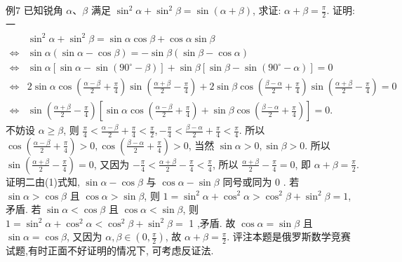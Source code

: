 例7 已知锐角 $\alpha 、 \beta$ 满足 $\sin ^2 \alpha+\sin ^2 \beta=\sin (\alpha+ \beta)$, 求证: $\alpha+\beta=\frac{\pi}{2}$.
证明:一 
$$
\begin{aligned}
& \sin ^2 \alpha+\sin ^2 \beta=\sin \alpha \cos \beta+\cos \alpha \sin \beta \\
\Leftrightarrow & \sin \alpha(\sin \alpha-\cos \beta)=-\sin \beta(\sin \beta-\cos \alpha) \\
\Leftrightarrow & \sin \alpha\left[\sin \alpha-\sin \left(90^{\circ}-\beta\right)\right]+\sin \beta\left[\sin \beta-\sin \left(90^{\circ}-\alpha\right)\right]=0 \\
\Leftrightarrow & 2 \sin \alpha \cos \left(\frac{\alpha-\beta}{2}+\frac{\pi}{4}\right) \sin \left(\frac{\alpha+\beta}{2}-\frac{\pi}{4}\right)+2 \sin \beta \cos \left(\frac{\beta-\alpha}{2}+\frac{\pi}{4}\right)  \sin \left(\frac{\alpha+\beta}{2}-\frac{\pi}{4}\right)=0 \\
\Leftrightarrow & \sin \left(\frac{\alpha+\beta}{2}-\frac{\pi}{4}\right)\left[\sin \alpha \cos \left(\frac{\alpha-\beta}{2}+\frac{\pi}{4}\right)+\sin \beta \cos \left(\frac{\beta-\alpha}{2}+\frac{\pi}{4}\right)\right]=0 .
\end{aligned}
$$
不妨设 $\alpha \geqslant \beta$, 则 $\frac{\pi}{4}<\frac{\alpha-\beta}{2}+\frac{\pi}{4}<\frac{\pi}{2},-\frac{\pi}{4}<\frac{\beta-\alpha}{2}+\frac{\pi}{4}<\frac{\pi}{4}$.
所以 $\cos \left(\frac{\alpha-\beta}{2}+\frac{\pi}{4}\right)>0, \cos \left(\frac{\beta-\alpha}{2}+\frac{\pi}{4}\right)>0$, 当然 $\sin \alpha>0, \sin \beta>0$.
所以 $\sin \left(\frac{\alpha+\beta}{2}-\frac{\pi}{4}\right)=0$, 又因为 $-\frac{\pi}{4}<\frac{\alpha+\beta}{2}-\frac{\pi}{4}<\frac{\pi}{4}$, 所以 $\frac{\alpha+\beta}{2}- \frac{\pi}{4}=0$, 即 $\alpha+\beta=\frac{\pi}{2}$.
证明二由(1)式知, $\sin \alpha-\cos \beta$ 与 $\cos \alpha-\sin \beta$ 同号或同为 0 .
若 $\sin \alpha>\cos \beta$ 且 $\cos \alpha>\sin \beta$, 则 $1=\sin ^2 \alpha+\cos ^2 \alpha>\cos ^2 \beta+\sin ^2 \beta=1$, 矛盾.
若 $\sin \alpha<\cos \beta$ 且 $\cos \alpha<\sin \beta$, 则 $1=\sin ^2 \alpha+\cos ^2 \alpha<\cos ^2 \beta+\sin ^2 \beta=$ 1 ,矛盾.
故 $\cos \alpha=\sin \beta$ 且 $\sin \alpha=\cos \beta$, 又因为 $\alpha, \beta \in\left(0, \frac{\pi}{2}\right)$, 故 $\alpha+\beta=\frac{\pi}{2}$.
评注本题是俄罗斯数学竞赛试题,有时正面不好证明的情况下, 可考虑反证法.



